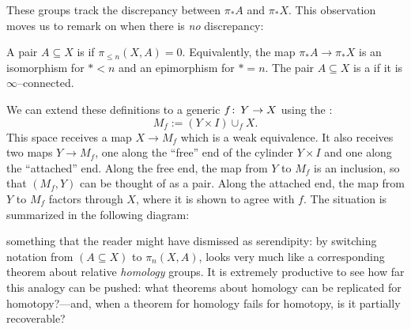 
These groups track the discrepancy between $\pi_* A$ and $\pi_* X$.
This observation moves us to remark on when there is \emph{no} discrepancy:

\begin{definition}
A pair $A \subseteq X$ is  if $\pi_{\le n}(X, A) = 0$.
Equivalently, the map $\pi_* A \to \pi_* X$ is an isomorphism for $* < n$ and an epimorphism for $* = n$.
The pair $A \subseteq X$ is a  if it is $\infty$--connected.
\end{definition}

\begin{remark}
We can extend these definitions to a generic $f\colon\thinspace Y \to X$ using the : \[M_f := (Y \times I) \cup_f X.\]
This space receives a map $X \to M_f$ which is a weak equivalence.
It also receives two maps $Y \to M_f$, one along the ``free'' end of the cylinder $Y \times I$ and one along the ``attached'' end.
Along the free end, the map from $Y$ to $M_f$ is an inclusion, so that $(M_f, Y)$ can be thought of as a pair.
Along the attached end, the map from $Y$ to $M_f$ factors through $X$, where it is shown to agree with $f$.
The situation is summarized in the following diagram:
\begin{center}
\end{center}
\end{remark}

 something that the reader might have dismissed as serendipity: by switching notation from $(A \subseteq X)$ to $\pi_n(X, A)$,  looks very much like a corresponding theorem about relative \emph{homology} groups.
It is extremely productive to see how far this analogy can be pushed: what theorems about homology can be replicated for homotopy?---and, when a theorem for homology fails for homotopy, is it partially recoverable?

